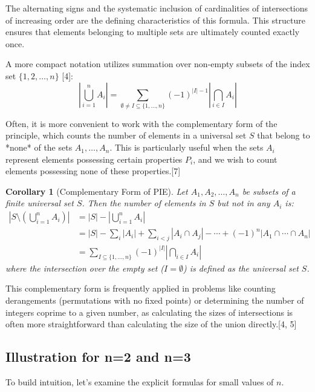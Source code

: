 \documentclass[11pt]{amsart}
\theoremstyle{plain}
\newtheorem{corollary}[theorem]{Corollary}
\theoremstyle{definition}
\theoremstyle{remark}
\begin{document}
The alternating signs and the systematic inclusion of cardinalities of intersections of increasing order are the defining characteristics of this formula. This structure ensures that elements belonging to multiple sets are ultimately counted exactly once.

A more compact notation utilizes summation over non-empty subsets of the index set $\{1, 2, \ldots, n\}$ [4]:
\begin{equation}
\left| \bigcup_{i=1}^n A_i \right| = \sum_{\emptyset \neq I \subseteq \{1, \ldots, n\}} (-1)^{|I|-1} \left| \bigcap_{i \in I} A_i \right|
\label{eq:pie_compact}
\end{equation}

Often, it is more convenient to work with the complementary form of the principle, which counts the number of elements in a universal set $S$ that belong to *none* of the sets $A_1, \ldots, A_n$. This is particularly useful when the sets $A_i$ represent elements possessing certain properties $P_i$, and we wish to count elements possessing none of these properties.[7]
\begin{corollary}[Complementary Form of PIE]
Let $A_1, A_2, \ldots, A_n$ be subsets of a finite universal set $S$. Then the number of elements in $S$ but not in any $A_i$ is:
\begin{align*}
\left| S \setminus \left( \bigcup_{i=1}^n A_i \right) \right| &= |S| - \left| \bigcup_{i=1}^n A_i \right| \\
&= |S| - \sum_{i} |A_i| + \sum_{i<j} |A_i \cap A_j| - \cdots + (-1)^n |A_1 \cap \cdots \cap A_n| \\
&= \sum_{I \subseteq \{1, \ldots, n\}} (-1)^{|I|} \left| \bigcap_{i \in I} A_i \right|
\label{eq:pie_complementary}
\end{align*}
where the intersection over the empty set ($I=\emptyset$) is defined as the universal set $S$.
\end{corollary}
This complementary form is frequently applied in problems like counting derangements (permutations with no fixed points) or determining the number of integers coprime to a given number, as calculating the sizes of intersections is often more straightforward than calculating the size of the union directly.[4, 5]

\subsection{Illustration for n=2 and n=3}
To build intuition, let's examine the explicit formulas for small values of $n$.
\end{document}
